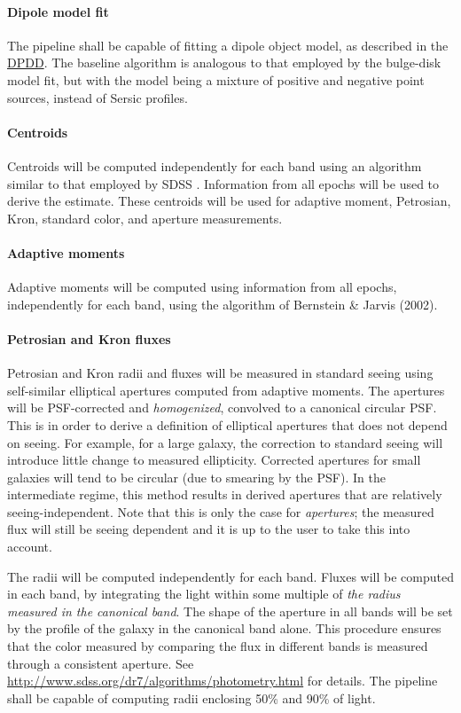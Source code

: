 \documentclass[12pt]{article}
\newcommand{\ds}[2]{{\color{blue} \href{https://docushare.lsstcorp.org/docushare/dsweb/Get/#1}{#2}}\xspace}
\newcommand{\DPDD}{\ds{LSE-163}{DPDD}}
\begin{document}
\paragraph{Dipole model fit}

The pipeline shall be capable of fitting a dipole object model, as described in the \DPDD\@. The baseline algorithm is analogous to that employed by the bulge-disk model fit, but with the model being a mixture of positive and negative point sources, instead of Sersic profiles.

\paragraph{Centroids} Centroids will be computed independently for each band using an algorithm similar to that employed by SDSS \cite{LuptonPhoto}. Information from all epochs will be used to derive the estimate. These centroids will be used for adaptive moment, Petrosian, Kron, standard color, and aperture measurements.

\paragraph{Adaptive moments} Adaptive moments will be computed using information from all epochs, independently for each band, using the algorithm of Bernstein \& Jarvis (2002).

\paragraph{Petrosian and Kron fluxes} Petrosian and Kron radii and fluxes will be measured in standard seeing using self-similar elliptical apertures computed from adaptive moments. The apertures will be PSF-corrected and \emph{homogenized}, convolved to a canonical circular PSF\@. This is in order to derive a definition of elliptical apertures that does not depend on seeing. For example, for a large galaxy, the correction to standard seeing will introduce little change to measured ellipticity. Corrected apertures for small galaxies will tend to be circular (due to smearing by the PSF). In the intermediate regime, this method results in derived apertures that are relatively seeing-independent. Note that this is only the case for \emph{apertures}; the measured flux will still be seeing dependent and it is up to the user to take this into account.

The radii will be computed independently for each band. Fluxes will be computed in each band, by integrating the light within some multiple of \emph{the radius measured in the canonical band}. The shape of the aperture in all bands will be set by the profile of the galaxy in the canonical band alone. This procedure ensures that the color measured by comparing the flux in different bands is measured through a consistent aperture. See \url{http://www.sdss.org/dr7/algorithms/photometry.html} for details. The pipeline shall be capable of computing radii enclosing 50\% and 90\% of light.
\end{document}
